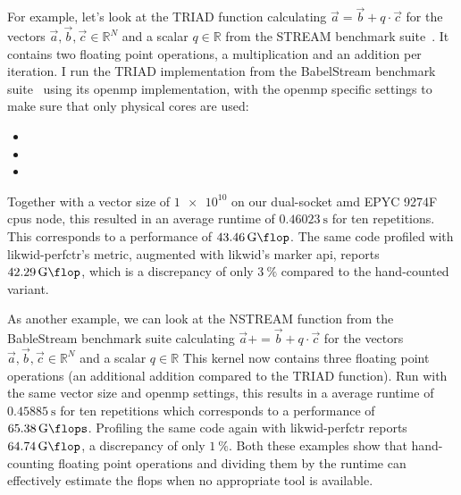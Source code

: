 For example, let's look at the TRIAD function calculating $\vec{a} = \vec{b} + q \cdot \vec{c}$ for the vectors $\vec{a}, \vec{b}, \vec{c} \in \mathbb{R}^N$ and a scalar $q \in \mathbb{R}$ from the STREAM benchmark suite~\cite{mccalpin_memory_1995}. 
It contains two floating point operations, a multiplication and an addition per iteration. 
I run the TRIAD implementation from the BabelStream benchmark suite~\cite{deakin_evaluating_2018} using its \gls{openmp} implementation, with the \gls{openmp} specific settings to make sure that only physical cores are used: 
\begin{itemize}
    \item {}
    \item {}
    \item {}
\end{itemize}
Together with a vector size of $\num{1e10}$ on our dual-socket \gls{amd} EPYC 9274F \glspl{cpu} node, this resulted in an average runtime of $\SI{0.46023}{\second}$ for ten repetitions.
This corresponds to a performance of $\SI{43.46}{\giga\flop}$. 
The same code profiled with likwid-perfctr's  metric, augmented with likwid's marker \gls{api}, reports $\SI{42.29}{\giga\flop}$, which is a discrepancy of only $\SI{3}{\percent}$ compared to the hand-counted variant. 

As another example, we can look at the NSTREAM function from the BableStream benchmark suite calculating $\vec{a} += \vec{b} + q \cdot \vec{c}$ for the vectors $\vec{a}, \vec{b}, \vec{c} \in \mathbb{R}^N$ and a scalar $q \in \mathbb{R}$
This kernel now contains three floating point operations (an additional addition compared to the TRIAD function). 
Run with the same vector size and \gls{openmp} settings, this results in a average runtime of $\SI{0.45885}{\second}$ for ten repetitions which corresponds to a performance of $\SI{65.38}{\giga\flops}$.
Profiling the same code again with likwid-perfctr reports $\SI{64.74}{\giga\flop}$, a discrepancy of only $\SI{1}{\percent}$. 
Both these examples show that hand-counting floating point operations and dividing them by the runtime can effectively estimate the \gls{flops} when no appropriate tool is available.  


